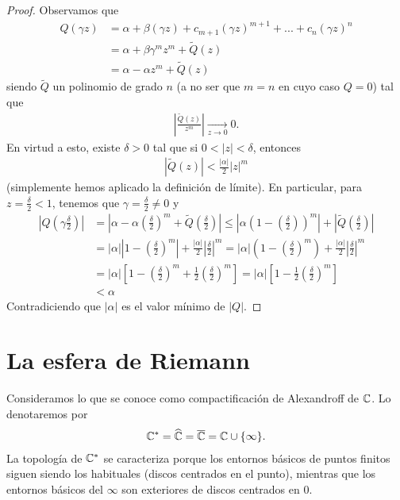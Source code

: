 \begin{proof}
    Observamos que
    \begin{align*}
        Q(\gamma z) & = \alpha + \beta(\gamma z) + c_{m+1}(\gamma z)^{m+1} + ... + c_n (\gamma z)^n \\
                    & = \alpha + \beta \gamma^m z^m + \widetilde{Q}(z)                              \\
                    & = \alpha - \alpha z^m + \widetilde{Q}(z)
    \end{align*}
    siendo $\widetilde{Q}$ un polinomio de grado $n$ (a no ser que $m = n$ en cuyo caso $Q = 0$) tal que
    \begin{align*}
        \left| \frac{\widetilde{Q}(z)}{z^m}\right| \xrightarrow[z \to 0]{} 0.
    \end{align*}
    En virtud a esto, existe $\delta > 0$ tal que si $0 < |z| < \delta$, entonces
    \begin{align*}
        |\widetilde{Q}(z)| < \frac{|\alpha|}{2}|z|^m
    \end{align*}
    (simplemente hemos aplicado la definición de límite). En particular, para $z = \frac{\delta}{2} < 1$, tenemos que $\gamma = \frac{\delta}{2} \not = 0$ y
    \begin{align*}
        \left|Q\left(\gamma \frac{\delta}{2}\right)\right| & = \left| \alpha - \alpha\left(\frac{\delta}{2}\right)^m + \widetilde{Q}\left( \frac{\delta}{2} \right)\right| \leq \left| \alpha\left( 1 - \left(\frac{\delta}{2}\right)\right)^m \right| + \left|\widetilde{Q}\left( \frac{\delta}{2} \right)\right| \\
                                                           & = |\alpha| \left| 1 - \left( \frac{\delta}{2}\right)^m\right| + \frac{|\alpha|}{2}\left|\frac{\delta}{2}\right|^m = |\alpha| \left( 1 - \left( \frac{\delta}{2}\right)^m\right) + \frac{|\alpha|}{2}\left|\frac{\delta}{2}\right|^m                   \\
                                                           & = |\alpha|\left[ 1 - \left( \frac{\delta}{2}\right)^m + \frac{1}{2}\left( \frac{\delta}{2}\right)^m\right] = |\alpha| \left[ 1 - \frac{1}{2}\left( \frac{\delta}{2}\right)^m\right]                                                                   \\
                                                           & < \alpha
    \end{align*}
    Contradiciendo que $|\alpha|$ es el valor mínimo de $|Q|$.
\end{proof}

\section{La esfera de Riemann}
Consideramos lo que se conoce como compactificación de Alexandroff de $\mathbb{C}$. Lo denotaremos por
\begin{align*}
    \mathbb{C}^* = \widehat{\mathbb{C}} = \overline{\mathbb{C}} = \mathbb{C} \cup \{\infty\}.
\end{align*}
La topología de $\mathbb{C}^*$ se caracteriza porque los entornos básicos de puntos finitos siguen siendo los habituales (discos centrados en el punto), mientras que los entornos básicos del $\infty$ son exteriores de discos centrados en $0$.


